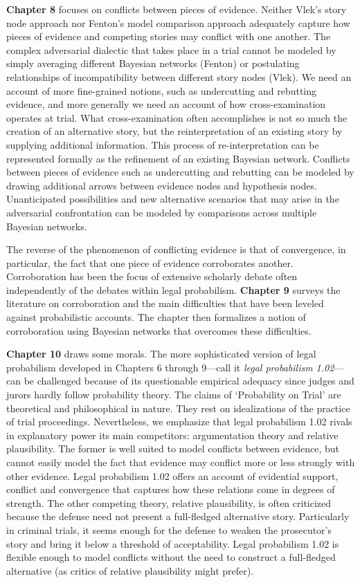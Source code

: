 \documentclass[
  10pt,
  dvipsnames,enabledeprecatedfontcommands]{scrartcl}
\begin{document}
\textbf{Chapter 8} focuses on conflicts between pieces of evidence.
Neither Vlek's story node approach nor Fenton's model comparison
approach adequately capture how pieces of evidence and competing stories
may conflict with one another. The complex adversarial dialectic that
takes place in a trial cannot be modeled by simply averaging different
Bayesian networks (Fenton) or postulating relationships of
incompatibility between different story nodes (Vlek). We need an account
of more fine-grained notions, such as undercutting and rebutting
evidence, and more generally we need an account of how cross-examination
operates at trial. What cross-examination often accomplishes is not so
much the creation of an alternative story, but the reinterpretation of
an existing story by supplying additional information. This process of
re-interpretation can be represented formally as the refinement of an
existing Bayesian network. Conflicts between pieces of evidence such as
undercutting and rebutting can be modeled by drawing additional arrows
between evidence nodes and hypothesis nodes. Unanticipated possibilities
and new alternative scenarios that may arise in the adversarial
confrontation can be modeled by comparisons across multiple Bayesian
networks.

The reverse of the phenomenon of conflicting evidence is that of
convergence, in particular, the fact that one piece of evidence
corroborates another. Corroboration has been the focus of extensive
scholarly debate often independently of the debates within legal
probabilism. \textbf{Chapter 9} surveys the literature on corroboration
and the main difficulties that have been leveled against probabilistic
accounts. The chapter then formalizes a notion of corroboration using
Bayesian networks that overcomes these difficulties.

\textbf{Chapter 10} draws some morals. The more sophisticated version of
legal probabilism developed in Chapters 6 through 9---call it
\textit{legal probabilism 1.02}---can be challenged because of its
questionable empirical adequacy since judges and jurors hardly follow
probability theory. The claims of `Probability on Trial' are theoretical
and philosophical in nature. They rest on idealizations of the practice
of trial proceedings. Nevertheless, we emphasize that legal probabilism
1.02 rivals in explanatory power its main competitors: argumentation
theory and relative plausibility. The former is well suited to model
conflicts between evidence, but cannot easily model the fact that
evidence may conflict more or less strongly with other evidence. Legal
probabilism 1.02 offers an account of evidential support, conflict and
convergence that captures how these relations come in degrees of
strength. The other competing theory, relative plausibility, is often
criticized because the defense need not present a full-fledged
alternative story. Particularly in criminal trials, it seems enough for
the defense to weaken the prosecutor's story and bring it below a
threshold of acceptability. Legal probabilism 1.02 is flexible enough to
model conflicts without the need to construct a full-fledged alternative
(as critics of relative plausibility might prefer).
\end{document}
